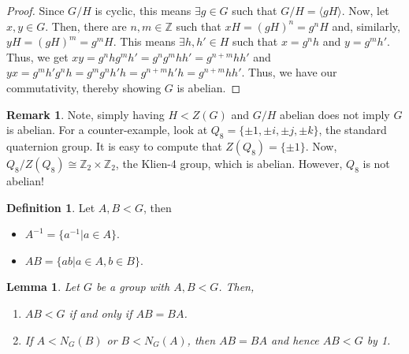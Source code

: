 \documentclass[11pt,leqno,oneside]{amsart}
\newcommand{\Z}{{\mathbb Z}} %
\newcommand{\subgroup}{\mathrel{<}}
\newtheorem{lem}[thm]{Lemma}
\theoremstyle{definition}
\newtheorem{defn}[thm]{Definition}
\newtheorem{rmk}[thm]{Remark}
\numberwithin{equation}{section}
\begin{document}
    \begin{proof}
        Since $G/H$ is cyclic, this means $\exists g \in G$ such that
        $G/H=\langle gH \rangle$. Now, let $x,y \in G$. Then, there are $n,m
        \in \Z$ such that $xH = (gH)^n = g^nH$ and, similarly, $yH = (gH)^m =
        g^mH$. This means $\exists h,h' \in H$ such that $x=g^nh$ and
        $y=g^mh'$. Thus, we get $xy = g^nhg^mh' = g^ng^mhh' = g^{n+m}hh'$ and
        $yx = g^mh'g^nh = g^mg^nh'h = g^{n+m}h'h = g^{n+m}hh'$. Thus, we have
        our commutativity, thereby showing $G$ is abelian.
    \end{proof}\begin{rmk}
        Note, simply having $H \subgroup Z(G)$ and $G/H$ abelian does not imply
        $G$ is abelian. For a counter-example, look at $Q_8 = \{\pm 1, \pm i,
        \pm j, \pm k\}$, the standard quaternion group. It is easy to compute
        that $Z(Q_8) = \{\pm 1\}$. Now, $Q_8/Z(Q_8) \cong \Z_2 \times \Z_2$,
        the Klien-4 group, which is abelian. However, $Q_8$ is not abelian!
    \end{rmk}
    \begin{defn}
        Let $A,B \subgroup G$, then \begin{itemize}
            \item $A^{-1} = \{a^{-1} | a \in A\}$.
            \item $AB = \{ab | a \in A, b \in B\}$.
        \end{itemize}
    \end{defn}
    \begin{lem}
        Let $G$ be a group with $A,B \subgroup G$. Then,
        \begin{enumerate}
            \item $AB \subgroup G$ if and only if $AB = BA$.
            \item If $A \subgroup N_G(B)$ or $B \subgroup N_G(A)$, then $AB =
                BA$ and hence $AB \subgroup G$ by 1. 
        \end{enumerate}
    \end{lem}
\end{document}
